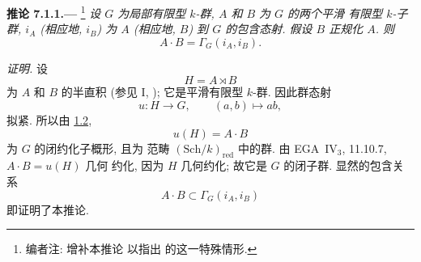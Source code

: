 
\medskip
{}\label{cor:sga3-VIB-7.1.1}%
\noindent\textbf{推论 7.1.1.---}%
\footnote{\label{note:sga3-VIB-70}编者注: 增补本推论
以指出  的这一特殊情形.}
\emph{设 \(G\) 为局部有限型 \(k\)-群,
\(A\) 和 \(B\) 为 \(G\) 的两个平滑
有限型 \(k\)-子群, \(i_A\) (相应地, \(i_B\)) 为
\(A\) (相应地, \(B\)) 到 \(G\) 的包含态射. 假设
\(B\) 正规化 \(A\). 则}
\label{form:sga3-VIB-7.1.1-generated-product}%
\[
  A\cdot B=\Gamma_G(i_A,i_B).
\]

\emph{证明.}
设
\[
  H=A\rtimes B
\]
为 \(A\) 和 \(B\) 的半直积 (参见 I, );
它是平滑有限型 \(k\)-群. 因此群态射
\[
  u:H\longrightarrow G,
  \qquad
  (a,b)\longmapsto ab,
\]
拟紧. 所以由
\hyperref[prop:sga3-VIB-1.2]{1.2},
\[
  u(H)=A\cdot B
\]
为 \(G\) 的闭约化子概形, 且为
范畴 \((\mathrm{Sch}/k)_{\mathrm{red}}\) 中的群. 由
EGA~IV\(_3\), 11.10.7, \(A\cdot B=u(H)\) 几何
约化, 因为 \(H\) 几何约化; 故它是 \(G\) 的闭子群.
显然的包含关系
\[
  A\cdot B\subset\Gamma_G(i_A,i_B)
\]
即证明了本推论.

